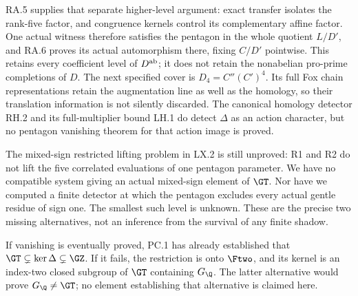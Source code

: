 RA.5 supplies that separate higher-level argument: exact
transfer isolates the rank-five factor, and congruence
kernels control its complementary affine factor. One
actual witness therefore satisfies the pentagon in the
whole quotient $L/D'$, and RA.6 proves its actual
automorphism there, fixing $C/D'$ pointwise. This retains
every coefficient level of $D^{\rm ab}$; it does not
retain the nonabelian pro-prime completions of $D$.
The next specified cover is $D_4=C''(C')^4$. Its full
Fox chain representations retain the augmentation line
as well as the homology, so their translation information
is not silently discarded.
The canonical homology detector RH.2 and its full-multiplier
bound LH.1 do detect $\Delta$ as an action character, but no
pentagon vanishing theorem for that action image is proved.

The mixed-sign restricted lifting problem in LX.2 is still
unproved: R1 and R2 do not lift the five correlated evaluations
of one pentagon parameter. We have no compatible system giving
an actual mixed-sign element of $\GT$. Nor have we computed a
finite detector at which the pentagon excludes every actual
gentle residue of sign one. The smallest such level is unknown.
These are the precise two missing alternatives, not an inference
from the survival of any finite shadow.

If vanishing is eventually proved, PC.1 has already established
that $\GT\subsetneq\ker\Delta\subsetneq\GZ$.
If it fails, the restriction is onto $\Ftwo$, and its kernel is
an index-two closed subgroup of $\GT$ containing $G_{\Q}$.
The latter alternative would prove $G_{\Q}\ne\GT$; no element
establishing that alternative is claimed here.

